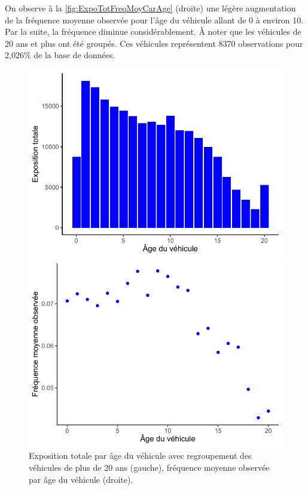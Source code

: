 On observe à la \autoref{fig:ExpoTotFreqMoyCarAge} (droite) une légère augmentation de la fréquence moyenne observée pour l'âge du véhicule allant de 0 à environ 10. Par la suite, la fréquence diminue considérablement. À noter que les véhicules de 20 ans et plus ont été 
groupés. Ces véhicules représentent 8370 observations pour 2,026\% de la base de données.

\begin{figure}
\caption{\label{fig:ExpoTotFreqMoyCarAge} Exposition totale par âge du véhicule avec regroupement des véhicules de plus de 20 ans (gauche), fréquence moyenne observée par âge du véhicule (droite).}
\begin{minipage}{0.4\linewidth}
\includegraphics[scale=0.5]{Graphiques/ExpoTotCarAge}
\end{minipage}
\hfill
\begin{minipage}{0.4\linewidth}
\includegraphics[scale=0.5]{Graphiques/FreqMoyCarAge}
\end{minipage}
\end{figure}

